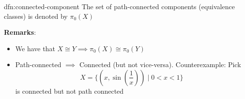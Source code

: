 \documentclass{article}
\begin{document}
\begin{dfn}{dfn:connected-component}{}
    The set of path-connected components (equivalence classes) is denoted by $\pi_{0}(X)$
\end{dfn}

\textbf{Remarks}:
\begin{itemize}
    \item We have that $X \cong Y \implies \pi_{0}(X) \cong \pi_{0}(Y)$
    \item Path-connected $\implies$ Connected (but not vice-versa). Counterexample: Pick 
        \[X = \{(x, \sin(\frac{1}{x})) \mid 0 < x < 1\}\]
        is connected but not path connected
\end{itemize}
\end{document}
